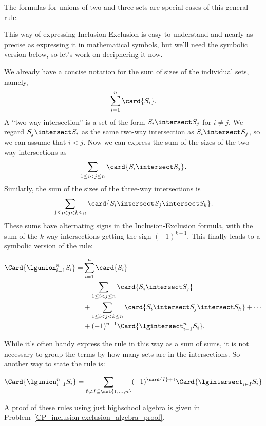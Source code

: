 The formulas for unions of two and three sets are special cases of this
general rule.

This way of expressing Inclusion-Exclusion is easy to understand and
nearly as precise as expressing it in mathematical symbols, but we'll need
the symbolic version below, so let's work on deciphering it now.

We already have a concise notation for the sum of sizes of the
individual sets, namely,
\[
\sum_{i=1}^n \card{S_i}.
\]
A ``two-way intersection'' is a set of the form $S_i \intersect S_j$ for
$i \neq j$.  We regard $S_j \intersect S_i$ as the same two-way
intersection as $S_i \intersect S_j$, so we can assume that $i < j$.  Now
we can express the sum of the sizes of the two-way intersections as
\[
\sum_{1\leq i < j \leq n} \card{S_i \intersect S_j}.
\]
Similarly, the sum of the sizes of the three-way intersections is
\[
\sum_{1\leq i < j < k \leq n} \card{S_i \intersect S_j \intersect S_k}.
\]
These sums have alternating signs in the Inclusion-Exclusion formula, with
the sum of the $k$-way intersections getting the sign $(-1)^{k-1}$.  This
finally leads to a symbolic version of the rule:

\begin{rul*}
\begin{align*}
\Card{\lgunion_{i=1}^n S_i}
   = & \sum_{i=1}^n \card{S_i}\\
     & - \sum_{1\leq i < j \leq n} \card{S_i \intersect S_j}\\
     &  + \sum_{1\leq i < j < k \leq n} \card{S_i \intersect S_j
       \intersect S_k} + \cdots\\
     & + (-1)^{n-1} \Card{\lgintersect_{i=1}^n S_i}.
\end{align*}
\end{rul*}

While it's often handy express the rule in this way as a sum of sums,
it is not necessary to group the terms by how many sets are in the
intersections.  So another way to state the rule is:

\begin{rul*}
\begin{equation}\label{incexII}
\Card{\lgunion_{i=1}^n S_i}
   =  \sum_{\emptyset \neq I \subseteq \set{1,\dots,n}} (-1)^{\card{I}+1} \Card{\lgintersect_{i \in I} S_i}
\end{equation}
\end{rul*}

A proof of these rules using just highschool algebra is given in
Problem~\ref{CP_inclusion-exclusion_algebra_proof}.


